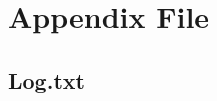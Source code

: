 \documentclass[nofootinbib,aps]{revtex4}
\begin{document}
\newpage

\section{Appendix File}

\subsection{Log.txt}


\end{document}
